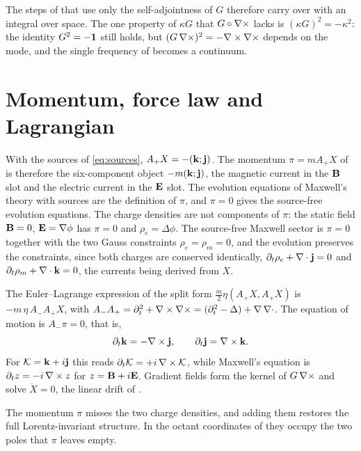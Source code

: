 The steps of  that use only the self-adjointness of $G$ therefore carry over with an integral over space. The one
property of $\kappa G$ that $G\circ\nabla\times$ lacks is $(\kappa G)^2=-\kappa^2$: the identity $G^2=-\mathbf 1$ still holds, but
$(G\,\nabla\times)^2=-\nabla\times\nabla\times$ depends on the mode, and the single frequency of  becomes a continuum.

\section{Momentum, force law and Lagrangian}
\label{sec:results2}

\begin{proposition}
\label{prop:momentum}
With the sources of \cref{eq:sources}, $A_+X=-(\mathbf k;\mathbf j)$. The momentum $\pi=mA_+X$ of  is therefore the six-component
object $-m(\mathbf k;\mathbf j)$, the magnetic current in the $\mathbf B$ slot and the electric current in the $\mathbf E$ slot. The evolution equations of
Maxwell's theory with sources are the definition of $\pi$, and $\pi=0$ gives the source-free evolution equations. The charge densities are
not components of $\pi$: the static field $\mathbf B=0$, $\mathbf E=\nabla\phi$ has $\pi=0$ and $\rho_e=\Delta\phi$. The source-free Maxwell sector is
$\pi=0$ together with the two Gauss constraints $\rho_e=\rho_m=0$, and the evolution preserves the constraints, since both charges are
conserved identically, $\partial_t\rho_e+\nabla\cdot\mathbf j=0$ and $\partial_t\rho_m+\nabla\cdot\mathbf k=0$, the currents being derived from $X$.
\end{proposition}

\begin{theorem}
\label{thm:force}
The Euler--Lagrange expression of the split form $\tfrac m2\eta(A_+X,A_+X)$ is $-m\,\eta\,A_-A_+X$, with
$A_-A_+=\partial_t^2+\nabla\times\nabla\times=(\partial_t^2-\Delta)+\nabla\,\nabla\cdot$. The equation of motion is $A_-\pi=0$, that is,
\[
\partial_t\mathbf k=-\nabla\times\mathbf j,\qquad \partial_t\mathbf j=\nabla\times\mathbf k .
\]
For $\mathcal K=\mathbf k+i\mathbf j$ this reads $\partial_t\mathcal K=+i\,\nabla\times\mathcal K$, while Maxwell's equation is $\partial_tz=-i\,\nabla\times z$ for
$z=\mathbf B+i\mathbf E$. Gradient fields form the kernel of $G\,\nabla\times$ and solve $\ddot X=0$, the linear drift of .
\end{theorem}

The momentum $\pi$ misses the two charge densities, and adding them restores the full Lorentz-invariant structure. In the octant
coordinates of  they occupy the two poles that $\pi$ leaves empty.

